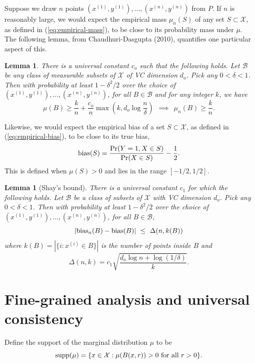 \documentclass{article}
\def\pr{{\rm Pr}}
\def\X{{\mathcal X}}
\def\B{{\mathcal B}}
\def\bias{{\rm bias}}
\def\supp{{\rm supp}}
\newtheorem{lemma}[thm]{Lemma}
\begin{document}
Suppose we draw $n$ points $(x^{(1)}, y^{(1)}), \ldots, (x^{(n)}, y^{(n)})$ from $P$. If $n$ is reasonably large, we would expect the empirical mass $\mu_n(S)$ of any set $S \subset \X$, as defined in (\ref{eq:empirical-mass}), to be close to its probability mass under $\mu$. The following lemma, from Chaudhuri-Dasgupta (2010), quantifies one particular aspect of this.
\begin{lemma}
There is a universal constant $c_o$ such that the following holds. Let $\B$ be any class of measurable subsets of $\X$ of VC dimension $d_o$. Pick any $0 < \delta < 1$. Then with probability at least $1-\delta^2/2$ over the choice of $(x^{(1)}, y^{(1)}), \ldots, (x^{(n)}, y^{(n)})$, for all $B \in \B$ and for any integer $k$, we have
$$ \mu(B) \geq \frac{k}{n} + \frac{c_o}{n} \max \left( k, d_o \log \frac{n}{\delta} \right)
\ \ \implies \ \ 
\mu_n(B) \geq \frac{k}{n} .$$
\label{lemma:points-in-balls}
\end{lemma}

Likewise, we would expect the empirical bias of a set $S \subset \X$, as defined in (\ref{eq:empirical-bias}), to be close to its true bias,
$$ \bias(S) = \frac{\pr(Y = 1, X \in S)}{\pr(X \in S)} - \frac{1}{2} .$$
This is defined when $\mu(S) > 0$ and lies in the range $[-1/2,1/2]$.

\begin{lemma}[Shay's bound]
There is a universal constant $c_1$ for which the following holds. Let $\B$ be a class of subsets of $\X$ with VC dimension $d_o$. Pick any $0 < \delta < 1$. Then with probability at least $1-\delta^2/2$ over the choice of $(x^{(1)}, y^{(1)}), \ldots, (x^{(n)}, y^{(n)})$, for all $B \in \B$,
  $$ \left| \bias_n(B) - \bias(B) \right| \ \leq \ \Delta(n, k(B)) $$
where $k(B) = |\{i: x^{(i)} \in B\}|$ is the number of points inside $B$ and 
\begin{equation}
\Delta(n,k) = c_1 \sqrt{\frac{d_o \log n + \log (1/\delta)}{k}} .
\label{eq:delta-defn}
\end{equation}
\label{lemma:bias}
\end{lemma}

\section{Fine-grained analysis and universal consistency}
\label{sec:universal-consistency}

Define the support of the marginal distribution $\mu$ to be
$$ \supp(\mu) = \{x \in \X: \mbox{$\mu(B(x,r)) > 0$ for all $r > 0$}\} .$$
\end{document}
